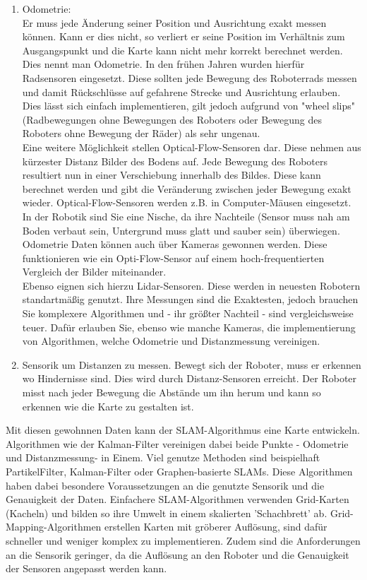 \documentclass[twoside,12pt,a4paper]{report}
\begin{document}
	\begin{enumerate}
		\item Odometrie:\\
		Er muss jede Änderung seiner Position und Ausrichtung exakt messen können. Kann er dies nicht, so verliert er seine Position im Verhältnis zum Ausgangspunkt und die Karte kann nicht mehr korrekt berechnet werden. Dies nennt man Odometrie. In den frühen Jahren wurden hierfür Radsensoren eingesetzt. Diese sollten jede Bewegung des Roboterrads messen und damit Rückschlüsse auf gefahrene Strecke und Ausrichtung erlauben. Dies lässt sich einfach implementieren, gilt jedoch aufgrund von "wheel slips" (Radbewegungen ohne Bewegungen des Roboters oder Bewegung des Roboters ohne Bewegung der Räder) als sehr ungenau. \\
		Eine weitere Möglichkeit stellen Optical-Flow-Sensoren dar. Diese nehmen aus kürzester Distanz Bilder des Bodens auf. Jede Bewegung des Roboters resultiert nun in einer Verschiebung innerhalb des Bildes. Diese kann berechnet werden und gibt die Veränderung zwischen jeder Bewegung exakt wieder. Optical-Flow-Sensoren werden z.B. in Computer-Mäusen eingesetzt. In der Robotik sind Sie eine Nische, da ihre Nachteile (Sensor muss nah am Boden verbaut sein, Untergrund muss glatt und sauber sein) überwiegen. \\
		Odometrie Daten können auch über Kameras gewonnen werden. Diese funktionieren wie ein Opti-Flow-Sensor auf einem hoch-frequentierten Vergleich der Bilder miteinander. \\
		Ebenso eignen sich hierzu Lidar-Sensoren. Diese werden in neuesten Robotern standartmäßig genutzt. Ihre Messungen sind die Exaktesten, jedoch brauchen Sie komplexere Algorithmen und - ihr größter Nachteil - sind vergleichsweise teuer. Dafür erlauben Sie, ebenso wie manche Kameras, die implementierung von Algorithmen, welche Odometrie und Distanzmessung vereinigen. 
		\item Sensorik um Distanzen zu messen. Bewegt sich der Roboter, muss er erkennen wo Hindernisse sind. Dies wird durch Distanz-Sensoren erreicht. Der Roboter misst nach jeder Bewegung die Abstände um ihn herum und kann so erkennen wie die Karte zu gestalten ist. 
	\end{enumerate}
	
	Mit diesen gewohnnen Daten kann der SLAM-Algorithmus eine Karte entwickeln. Algorithmen wie der Kalman-Filter vereinigen dabei beide Punkte - Odometrie und Distanzmessung- in Einem. Viel genutze Methoden sind beispielhaft PartikelFilter, Kalman-Filter oder Graphen-basierte SLAMs. Diese Algorithmen haben dabei besondere Voraussetzungen an die genutzte Sensorik und die Genauigkeit der Daten. Einfachere SLAM-Algorithmen verwenden Grid-Karten (Kacheln) und bilden so ihre Umwelt in einem skalierten 'Schachbrett' ab. Grid-Mapping-Algorithmen erstellen Karten mit gröberer Auflösung, sind dafür schneller und weniger komplex zu implementieren. Zudem sind die Anforderungen an die Sensorik geringer, da die Auflösung an den Roboter und die Genauigkeit der Sensoren angepasst werden kann.
	
\end{document}
